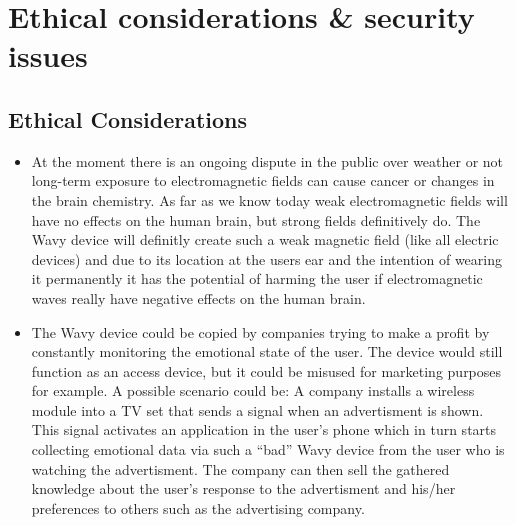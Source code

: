 \section{Ethical considerations \& security issues}
\label{sect:ethics-security}


\subsection{Ethical Considerations}
\begin{itemize}
\item {
At the moment there is an ongoing dispute in the public over weather or not long-term exposure to electromagnetic fields can cause cancer or changes in the brain chemistry. As far as we know today weak electromagnetic fields will have no effects on the human brain, but strong fields definitively do. The Wavy device will definitly create such a weak magnetic field (like all electric devices) and due to its location at the users ear and the intention of wearing it permanently it has the potential of harming the user if electromagnetic waves really have negative effects on the human brain. 
}
\item {
The Wavy device could be copied by companies trying to make a profit by constantly monitoring the emotional state of the user. The device would still function as an access device, but it could be misused for marketing purposes for example. A possible scenario could be: A company installs a wireless module into a TV set that sends a signal when an advertisment is shown. This signal activates an application in the user’s phone which in turn starts collecting emotional data via such a “bad” Wavy device from the user who is watching the advertisment. The company can then sell the gathered knowledge about the user’s response to the advertisment and his/her preferences to others such as the advertising company.
}
\end{itemize}


